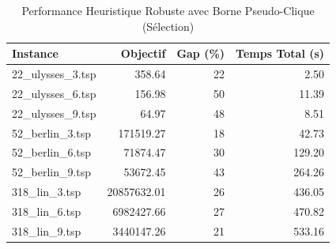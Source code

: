 \begin{table}[H]
\centering
\caption{Performance Heuristique Robuste avec Borne Pseudo-Clique (Sélection)}
\small
\begin{tabular}{|l|r|r|r|}
\hline
\textbf{Instance} & \textbf{Objectif} & \textbf{Gap (\%)} & \textbf{Temps Total (s)} \\
\hline
22\_ulysses\_3.tsp & 358.64 & 22 & 2.50 \\
22\_ulysses\_6.tsp & 156.98 & 50 & 11.39 \\
22\_ulysses\_9.tsp & 64.97 & 48 & 8.51 \\
52\_berlin\_3.tsp & 171519.27 & 18 & 42.73 \\
52\_berlin\_6.tsp & 71874.47 & 30 & 129.20 \\
52\_berlin\_9.tsp & 53672.45 & 43 & 264.26 \\
318\_lin\_3.tsp & 20857632.01 & 26 & 436.05 \\
318\_lin\_6.tsp & 6982427.66 & 27 & 470.82 \\
318\_lin\_9.tsp & 3440147.26 & 21 & 533.16 \\
\hline
\end{tabular}
\end{table}

